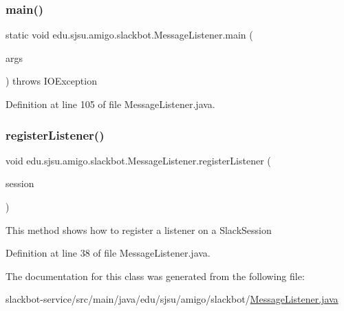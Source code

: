 \subsubsection{\texorpdfstring{main()}{main()}}
{\footnotesize\ttfamily static void edu.\+sjsu.\+amigo.\+slackbot.\+Message\+Listener.\+main (\begin{DoxyParamCaption}\item[{String \mbox{[}$\,$\mbox{]}}]{args }\end{DoxyParamCaption}) throws I\+O\+Exception\hspace{0.3cm}{\ttfamily [static]}}



Definition at line 105 of file Message\+Listener.\+java.

\mbox{\label{classedu_1_1sjsu_1_1amigo_1_1slackbot_1_1_message_listener_a1e02fd4fd7c7c34f764a6513c4ddf5bc}} 
\subsubsection{\texorpdfstring{register\+Listener()}{registerListener()}}
{\footnotesize\ttfamily void edu.\+sjsu.\+amigo.\+slackbot.\+Message\+Listener.\+register\+Listener (\begin{DoxyParamCaption}\item[{Slack\+Session}]{session }\end{DoxyParamCaption})}

This method shows how to register a listener on a Slack\+Session 

Definition at line 38 of file Message\+Listener.\+java.



The documentation for this class was generated from the following file\+:\begin{DoxyCompactItemize}
\item 
slackbot-\/service/src/main/java/edu/sjsu/amigo/slackbot/\hyperlink{_message_listener_8java}{Message\+Listener.\+java}\end{DoxyCompactItemize}
